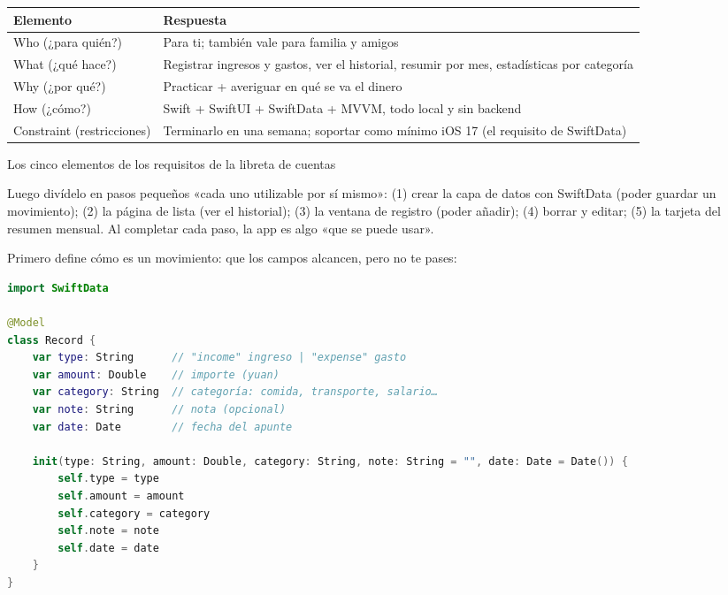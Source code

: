 


\begin{center}
\begin{tabularx}{\linewidth}{|X|X|}
\hline
\textbf{Elemento} & \textbf{Respuesta} \tabularnewline
\hline
Who (¿para quién?) & Para ti; también vale para familia y amigos \tabularnewline
What (¿qué hace?) & Registrar ingresos y gastos, ver el historial, resumir por mes, estadísticas por categoría \tabularnewline
Why (¿por qué?) & Practicar + averiguar en qué se va el dinero \tabularnewline
How (¿cómo?) & Swift + SwiftUI + SwiftData + MVVM, todo local y sin backend \tabularnewline
Constraint (restricciones) & Terminarlo en una semana; soportar como mínimo iOS 17 (el requisito de SwiftData) \tabularnewline
\hline
\end{tabularx}
\end{center}

\begin{center}\small\color{gray}Los cinco elementos de los requisitos de la libreta de cuentas\end{center}

Luego divídelo en pasos pequeños «cada uno utilizable por sí mismo»: (1) crear la capa de datos con SwiftData (poder guardar un movimiento); (2) la página de lista (ver el historial); (3) la ventana de registro (poder añadir); (4) borrar y editar; (5) la tarjeta del resumen mensual. Al completar cada paso, la app es algo «que se puede usar».


Primero define cómo es un movimiento: que los campos alcancen, pero no te pases:

\begin{lstlisting}[language=Swift]
import SwiftData

@Model
class Record {
    var type: String      // "income" ingreso | "expense" gasto
    var amount: Double    // importe (yuan)
    var category: String  // categoría: comida, transporte, salario…
    var note: String      // nota (opcional)
    var date: Date        // fecha del apunte

    init(type: String, amount: Double, category: String, note: String = "", date: Date = Date()) {
        self.type = type
        self.amount = amount
        self.category = category
        self.note = note
        self.date = date
    }
}
\end{lstlisting}

